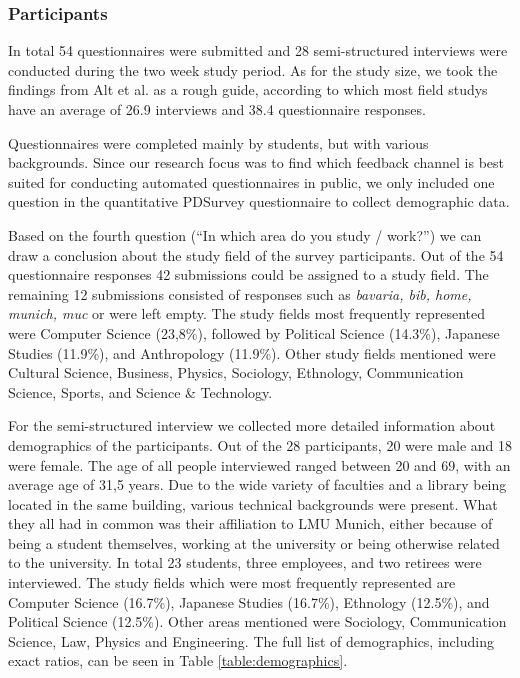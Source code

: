 	\subsubsection{Participants} %

		In total 54 questionnaires were submitted and 28 semi-structured interviews were conducted during the two week study period. As for the study size, we took the findings from Alt et al.\cite{Alt2012HowToEvaluate} as a rough guide, according to which most field studys have an average of 26.9 interviews and 38.4 questionnaire responses.

		Questionnaires were completed mainly by students, but with various backgrounds. Since our research focus was to find which feedback channel is best suited for conducting automated questionnaires in public, we only included one question in the quantitative PDSurvey questionnaire to collect demographic data. 

		Based on the fourth question (``In which area do you study / work?'') we can draw a conclusion about the study field of the survey participants. Out of the 54 questionnaire responses 42 submissions could be assigned to a study field. The remaining 12 submissions consisted of responses such as \textit{bavaria, bib, home, munich, muc} or were left empty. The study fields most frequently represented were Computer Science (23,8\%), followed by Political Science (14.3\%), Japanese Studies (11.9\%), and Anthropology (11.9\%). Other study fields mentioned were Cultural Science, Business, Physics, Sociology, Ethnology, Communication Science, Sports, and Science \& Technology. 

		For the semi-structured interview we collected more detailed information about demographics of the participants. Out of the 28 participants,
		20 were male and 18 were female. The age of all people interviewed ranged between 20 and 69, with an average age of 31,5 years.	Due to the wide variety of faculties and a library being located in the same building, various technical backgrounds were present. What they all had in common was their affiliation to LMU Munich, either because of being a student themselves, working at the university or being otherwise related to the university. In total 23 students, three employees, and two retirees were interviewed. The study fields which were most frequently represented are Computer Science (16.7\%), Japanese Studies (16.7\%), Ethnology (12.5\%), and Political Science (12.5\%). Other areas mentioned were Sociology, Communication Science, Law, Physics and Engineering. The full list of demographics, including exact ratios, can be seen in Table \ref{table:demographics}.


